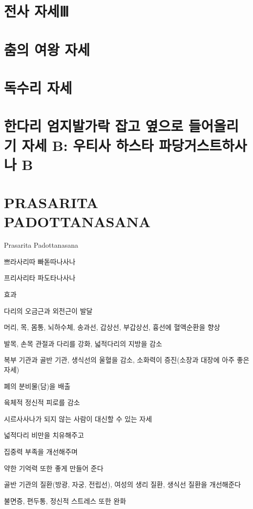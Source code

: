 \documentclass[12pt, a4paper, oneside]{book}
\let\stdsection\section
\renewcommand\section{\newpage\stdsection}
\begin{document}
		\section{전사 자세Ⅲ}

		\section{춤의 여왕 자세}
		\section{독수리 자세}

		\section{한다리 엄지발가락 잡고 옆으로 들어올리기 자세 B: 우티사 하스타 파당거스트하사나 B}




	\section{PRASARITA PADOTTANASANA}

	Prasarita Padottanasana
	
	쁘라사리따 빠돋따나사나
	
	프리사리타 파도타나사나
	
	
	
	효과
	
	다리의 오금근과 외전근이 발달
	
	머리, 목, 몸통, 뇌하수체, 송과선, 갑상선, 부갑상선, 흉선에 혈액순환을 향상
	
	발목, 손목 관절과 다리를 강화, 넓적다리의 지방을 감소
	
	복부 기관과 골반 기관, 생식선의 울혈을 감소, 소화력이 증진(소장과 대장에 아주 좋은 자세)
	
	폐의 분비물(담)을 배출
	
	육체적 정신적 피로를 감소
	
	시르사사나가 되지 않는 사람이 대신할 수 있는 자세
	
	
	
	넓적다리 비만을 치유해주고
	
	집중력 부족을 개선해주며
	
	약한 기억력 또한 좋게 만들어 준다
	
	골반 기관의 질환(방광, 자궁, 전립선), 여성의 생리 질환, 생식선 질환을 개선해준다
	
	불면증, 편두통, 정신적 스트레스 또한 완화
	
\end{document}
